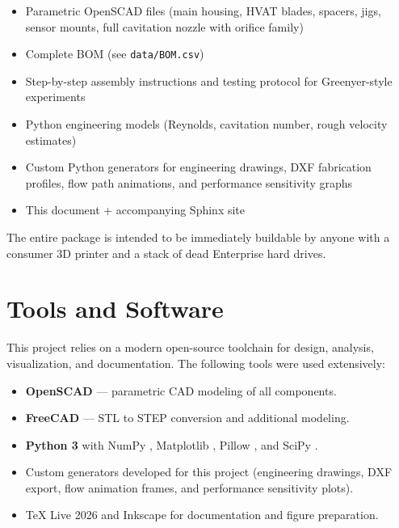 \documentclass[11pt,a4paper]{article}
\begin{document}
\begin{itemize}
    \item Parametric OpenSCAD files (main housing, HVAT blades, spacers, jigs, sensor mounts, full cavitation nozzle with orifice family)
    \item Complete BOM (see \texttt{data/BOM.csv})
    \item Step-by-step assembly instructions and testing protocol for Greenyer-style experiments
    \item Python engineering models (Reynolds, cavitation number, rough velocity estimates)
    \item Custom Python generators for engineering drawings, DXF fabrication profiles, flow path animations, and performance sensitivity graphs \cite{flow_conditioner_generators2026}
    \item This document + accompanying Sphinx site
\end{itemize}

The entire package is intended to be immediately buildable by anyone with a consumer 3D printer and a stack of dead Enterprise hard drives.

\section{Tools and Software}

This project relies on a modern open-source toolchain for design, analysis, visualization, and documentation. The following tools were used extensively:

\begin{itemize}
    \item \textbf{OpenSCAD} \cite{openscad2025} — parametric CAD modeling of all components.
    \item \textbf{FreeCAD} \cite{freecad2025} — STL to STEP conversion and additional modeling.
    \item \textbf{Python 3} \cite{python2025} with NumPy \cite{numpy2025}, Matplotlib \cite{matplotlib2025}, Pillow \cite{pillow2025}, and SciPy \cite{scipy2025}.
    \item Custom generators developed for this project \cite{flow_conditioner_generators2026} (engineering drawings, DXF export, flow animation frames, and performance sensitivity plots).
    \item \TeX{} Live 2026 \cite{texlive2026} and Inkscape \cite{inkscape2025} for documentation and figure preparation.
\end{itemize}
\end{document}
